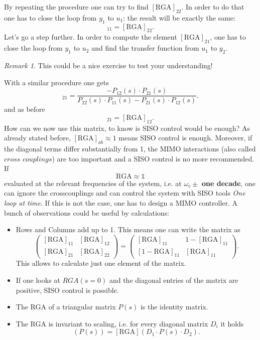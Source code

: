\documentclass[a4paper,12 pt]{article}
\numberwithin{equation}{section}
\theoremstyle{definition}
\theoremstyle{remark}
\newtheorem*{bmk}{Remark}
\theoremstyle{definition}
\theoremstyle{definition}
\theoremstyle{definition}
\theoremstyle{remark}
\begin{document}
By repeating the procedure one can try to find $[\text{RGA}]_{22}$. In order to do that one has to close the loop from $y_1$ to $u_1$: the result will be exactly the same:
\begin{equation}
[\text{RGA}]_{11}=[\text{RGA}]_{22}.
\end{equation}
Let's go a step further. In order to compute the element $[\text{RGA}]_{21}$, one has to close the loop from $y_1$ to $u_2$ and find the transfer function from $u_1$ to $y_2$.
\begin{bmk}
This could be a nice exercise to test your understanding!
\end{bmk}
With a similar procedure one gets
\begin{equation}
[\text{RGA}]_{21}=\frac{-P_{12}(s)\cdot P_{21}(s)}{P_{22}(s)\cdot P_{11}(s)-P_{21}(s)\cdot P_{12}(s)}.
\end{equation}
and as before
\begin{equation}
[\text{RGA}]_{21}=[\text{RGA}]_{12}.
\end{equation}
How can we now use this matrix, to know is SISO control would be enough? As already stated before, $[\text{RGA}]_{ab}\approx 1$ means SISO control is enough. Moreover, if the diagonal terms differ substantially from 1, the MIMO interactions (also called $\textit{cross couplings}$) are too important and a SISO control is no more recommended. \\ If
\begin{equation}
\text{RGA}\approx \mathbb{1}
\end{equation}
 evaluated at the relevant frequencies of the system, i.e. at $\omega_c \pm$ \textbf{one decade}, one can ignore the crosscouplings and can control the system with SISO tools \textit{One loop at time}. If this is not the case, one has to design a MIMO controller.
A bunch of observations could be useful by calculations:
\begin{itemize}
\item Rows and Columns add up to 1. This means one can write the matrix as
\begin{equation}
\begin{pmatrix}
[\text{RGA}]_{11}&[\text{RGA}]_{12}\\
[\text{RGA}]_{21}&[\text{RGA}]_{22}
\end{pmatrix}=\begin{pmatrix}
[\text{RGA}]_{11}&1-[\text{RGA}]_{11}\\
[1-\text{RGA}]_{11}&[\text{RGA}]_{11}
\end{pmatrix}.
\end{equation}
This allows to calculate just one element of the matrix. 
\item If one looks at $RGA(s=0)$ and the diagonal entries of the matrix are positive, SISO control is possible.
\item The RGA of a triangular matrix $P(s)$ is the identity matrix.
\item The RGA is invariant to scaling, i.e. for every diagonal matrix $D_i$ it holds
\begin{equation}
[\text{RGA}](P(s))=[\text{RGA}](D_1\cdot P(s) \cdot D_2).
\end{equation}
\end{itemize}
\end{document}
